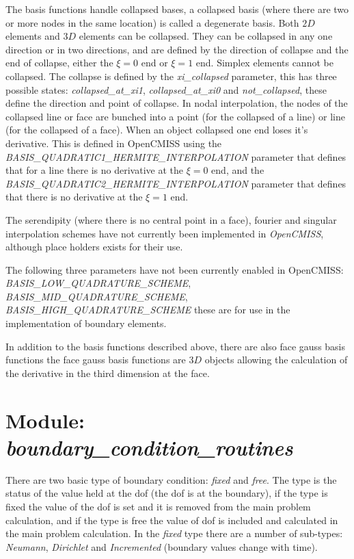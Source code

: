 The basis functions handle collapsed bases, a collapsed basis (where there are 
two or more nodes in the same location) is called a degenerate basis. Both $2D$ 
elements and $3D$ elements can be collapsed. They can be collapsed in any one 
direction or in two directions, and are defined by the direction of collapse 
and the end of collapse, either the $\xi=0$ end or $\xi=1$ end. Simplex elements 
cannot be collapsed. The collapse is defined by the \emph{xi\_collapsed} parameter, 
this has three possible states: \emph{collapsed\_at\_xi1}, \emph{collapsed\_at\_xi0} 
and \emph{not\_collapsed}, these define the direction and point of collapse. In nodal
interpolation, the nodes of the collapsed line or face are bunched into a 
point (for the collapsed of a line) or line (for the collapsed of a face).
When an object collapsed one end loses it's derivative. This is defined in 
OpenCMISS using the \emph{BASIS\_QUADRATIC1\_HERMITE\_INTERPOLATION} parameter that
defines that for a line there is no derivative at the $\xi=0$ end, and the  
\emph{BASIS\_QUADRATIC2\_HERMITE\_INTERPOLATION} parameter that defines that there is 
no derivative at the $\xi=1$ end.

The serendipity (where there is no central point in a face), fourier and
singular interpolation schemes have not currently been implemented in 
\emph{OpenCMISS}, although place holders exists for their use.

The following three parameters have not been currently enabled in OpenCMISS:  
\emph{BASIS\_LOW\_QUADRATURE\_SCHEME}, \emph{BASIS\_MID\_QUADRATURE\_SCHEME},
\emph{BASIS\_HIGH\_QUADRATURE\_SCHEME} these are for use in the implementation of
boundary elements.

In addition to the basis functions described above, there are also face gauss 
basis functions the face gauss basis functions are $3D$ objects allowing the 
calculation of the derivative in the third dimension at the face.


\section{Module: \emph{boundary\_condition\_routines}} 
\label{sec:boundaryconditionroutines}

There are two basic type of boundary condition: \emph{fixed} and \emph{free}. 
The type is the status of the value held at the dof (the dof is at the 
boundary), if the type is fixed the value of the dof is set and it is 
removed from the main problem calculation, and if the type is free the value 
of dof is included and calculated in the main problem calculation.
In the \emph{fixed} type there are a number of sub-types: \emph{Neumann}, 
\emph{Dirichlet} and \emph{Incremented} (boundary values change with time).

